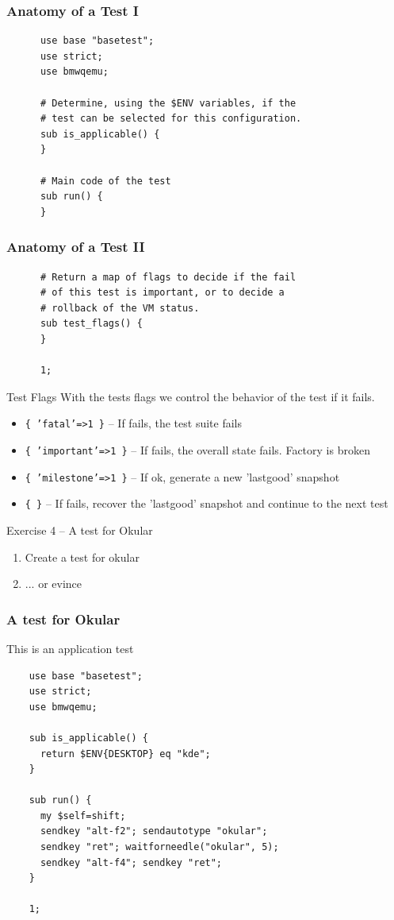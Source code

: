 \documentclass{beamer}
\begin{document}
%
%
\begin{frame}[fragile]
  \frametitle{Anatomy of a Test I}
    \lstset{style=myperl}
    \begin{lstlisting}
      use base "basetest";
      use strict;
      use bmwqemu;

      # Determine, using the $ENV variables, if the
      # test can be selected for this configuration.
      sub is_applicable() {
      }

      # Main code of the test
      sub run() {
      }
    \end{lstlisting}
\end{frame}

\begin{frame}[fragile]
  \frametitle{Anatomy of a Test II}
    \lstset{style=myperl}
    \begin{lstlisting}
      # Return a map of flags to decide if the fail
      # of this test is important, or to decide a
      # rollback of the VM status.
      sub test_flags() {
      }

      1;
    \end{lstlisting}
\end{frame}

\begin{frame}{Test Flags}
  With the tests flags we control the behavior of the test if it fails.
  \begin{itemize}
  \item \texttt{\{ 'fatal'=>1 \}} -- If fails, the test suite fails
  \item \texttt{\{ 'important'=>1 \}} -- If fails, the overall state fails. Factory is broken
  \item \texttt{\{ 'milestone'=>1 \}} -- If ok, generate a new 'lastgood' snapshot
  \item \texttt{\{ \}} -- If fails, recover the 'lastgood' snapshot and continue to the next test
  \end{itemize}
\end{frame}


%
%
\begin{frame}{Exercise 4 -- A test for Okular}
  \begin{enumerate}
  \item Create a test for okular
  \item ... or evince 
  \end{enumerate}
\end{frame}


\begin{frame}[fragile]
  \frametitle{A test for Okular}
  This is an application test
  \lstset{style=myperl}
  \begin{lstlisting}
    use base "basetest";
    use strict;
    use bmwqemu;

    sub is_applicable() {
      return $ENV{DESKTOP} eq "kde";
    }

    sub run() {
      my $self=shift;
      sendkey "alt-f2"; sendautotype "okular";
      sendkey "ret"; waitforneedle("okular", 5);
      sendkey "alt-f4"; sendkey "ret";
    }

    1;
  \end{lstlisting}
\end{frame}
\end{document}
